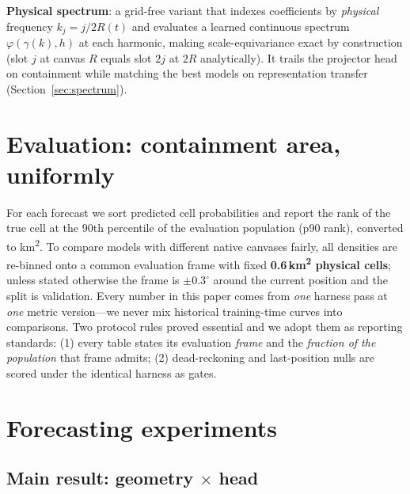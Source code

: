 \documentclass{article}
\begin{document}
\textbf{Physical spectrum}: a grid-free variant that indexes coefficients
by \emph{physical} frequency $k_j = j/2R(t)$ and evaluates a learned
continuous spectrum $\varphi(\gamma(k), h)$ at each harmonic, making
scale-equivariance exact by construction (slot $j$ at canvas $R$ equals
slot $2j$ at $2R$ analytically). It trails the projector head on
containment while matching the best models on representation transfer
(Section~\ref{sec:spectrum}).

\section{Evaluation: containment area, uniformly}
\label{sec:metric}

For each forecast we sort predicted cell probabilities and report the rank
of the true cell at the 90th percentile of the evaluation population
(p90 rank), converted to km\textsuperscript{2}. To compare models with
different native canvases fairly, all densities are re-binned onto a common
evaluation frame with fixed \textbf{0.6\,km\textsuperscript{2} physical
cells}; unless stated otherwise the frame is $\pm0.3^{\circ}$ around the
current position and the split is validation. Every number in this paper
comes from \emph{one} harness pass at \emph{one} metric version---we never
mix historical training-time curves into comparisons. Two protocol rules
proved essential and we adopt them as reporting standards:
(1) every table states its evaluation \emph{frame} and the \emph{fraction
of the population} that frame admits; (2) dead-reckoning and last-position
nulls are scored under the identical harness as gates.

\section{Forecasting experiments}

\subsection{Main result: geometry $\times$ head}
\label{sec:georesults}
\end{document}
